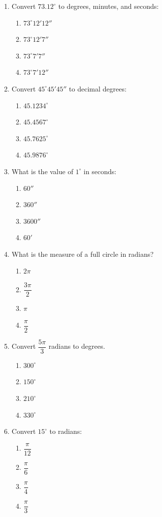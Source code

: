 \documentclass[11pt]{article}
\begin{document}
\begin{enumerate}[label=\textbf{\arabic*.}, start=204, leftmargin=2em]
\item Convert $73.12^\circ$ to degrees, minutes, and seconds:
\begin{enumerate}[label=(\Alph*)] \item $73^\circ12'12''$ \item $73^\circ12'7''$ \item $73^\circ7'7''$ \item $73^\circ7'12''$ \end{enumerate}

\item Convert $45^\circ45'45''$ to decimal degrees:
\begin{enumerate}[label=(\Alph*)] \item $45.1234^\circ$ \item $45.4567^\circ$ \item $45.7625^\circ$ \item $45.9876^\circ$ \end{enumerate}

\item What is the value of $1^\circ$ in seconds:
\begin{enumerate}[label=(\Alph*)] \item $60''$ \item $360''$ \item $3600''$ \item $60'$ \end{enumerate}

\item What is the measure of a full circle in radians?
\begin{enumerate}[label=(\Alph*)] \item $2\pi$ \item $\dfrac{3\pi}{2}$ \item $\pi$ \item $\dfrac{\pi}{2}$ \end{enumerate}

\item Convert $\dfrac{5\pi}{3}$ radians to degrees.
\begin{enumerate}[label=(\Alph*)] \item $300^\circ$ \item $150^\circ$ \item $210^\circ$ \item $330^\circ$ \end{enumerate}

\item Convert $15^\circ$ to radians:
\begin{enumerate}[label=(\Alph*)] \item $\dfrac{\pi}{12}$ \item $\dfrac{\pi}{6}$ \item $\dfrac{\pi}{4}$ \item $\dfrac{\pi}{3}$ \end{enumerate}


\end{enumerate}
\end{document}
